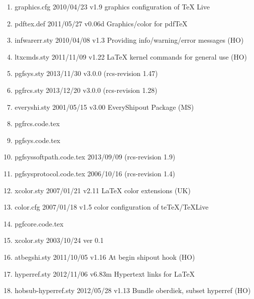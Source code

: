 \begin{enumerate}
\item graphics.cfg 2010/04/23 v1.9 graphics configuration of TeX Live
\item pdftex.def 2011/05/27 v0.06d Graphics/color for pdfTeX
\item infwarerr.sty 2010/04/08 v1.3 Providing info/warning/error messages (HO)
\item ltxcmds.sty 2011/11/09 v1.22 LaTeX kernel commands for general use (HO)
\item pgfsys.sty 2013/11/30 v3.0.0 (rcs-revision 1.47)
\item pgfrcs.sty 2013/12/20 v3.0.0 (rcs-revision 1.28)
\item everyshi.sty 2001/05/15 v3.00 EveryShipout Package (MS)
\item pgfrcs.code.tex
\item pgfsys.code.tex
\item pgfsyssoftpath.code.tex 2013/09/09 (rcs-revision 1.9)
\item pgfsysprotocol.code.tex 2006/10/16 (rcs-revision 1.4)
\item xcolor.sty 2007/01/21 v2.11 LaTeX color extensions (UK)
\item color.cfg 2007/01/18 v1.5 color configuration of teTeX/TeXLive
\item pgfcore.code.tex
\item 	xcolor.sty 2003/10/24 ver 0.1
\item atbegshi.sty 2011/10/05 v1.16 At begin shipout hook (HO)
\item hyperref.sty 2012/11/06 v6.83m Hypertext links for LaTeX
\item hobsub-hyperref.sty 2012/05/28 v1.13 Bundle oberdiek, subset hyperref (HO)

\end{enumerate}
